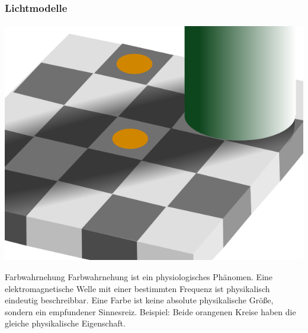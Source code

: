 \documentclass{beamer}
\begin{document}
\begin{frame}
    \frametitle{Lichtmodelle}
\framesubtitle{}
\begin{center}
\includegraphics[scale=0.225]{images/subjektivefarbwahrnehmung}
\end{center}
    \begin{block}{Farbwahrnehung}
Farbwahrnehung  ist ein physiologisches Phänomen. Eine elektromagnetische Welle mit
einer bestimmten Frequenz ist physikalisch eindeutig beschreibbar. Eine Farbe ist keine
absolute physikalische Größe, sondern ein empfundener Sinnesreiz. Beispiel: Beide orangenen Kreise haben die gleiche physikalische Eigenschaft.
\end{block}
\end{frame}
\end{document}
